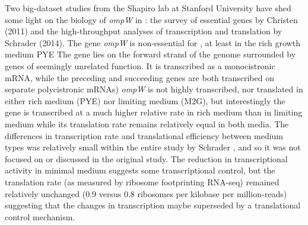 Two big-dataset studies from the Shapiro lab at Stanford University have shed some light on the biology of \textit{ompW} in \caulobacter: the survey of essential genes by Christen \etal (2011) and the high-throughput analyses of transcription and translation by Schrader \etal (2014). The gene \textit{ompW} is non-essential for \caulobacter, at least in the rich growth medium \ac{PYE} The gene lies on the forward strand of the genome surrounded by genes of seemingly unrelated function. It is transcribed as a monocistronic mRNA, while the preceding and succeeding genes are both transcribed on separate polycistronic mRNAs) \textit{ompW} is not highly transcribed, nor translated in either rich medium (\ac{PYE}) nor limiting medium (M2G), but interestingly the gene is transcribed at a much higher relative rate in rich medium than in limiting medium while its translation rate remains relatively equal in both media. The differences in transcription rate and translational efficiency between medium types was relatively small within the entire study by Schrader \etal, and so it was not focused on or discussed in the original study. The reduction in transcriptional activity in minimal medium suggests some transcriptional control, but the translation rate (as measured by ribosome footprinting RNA-seq) remained relatively unchanged (0.9 versus 0.8 ribosomes per kilobase per million-reads) suggesting that the changes in transcription maybe superseded by a translational control mechanism.

